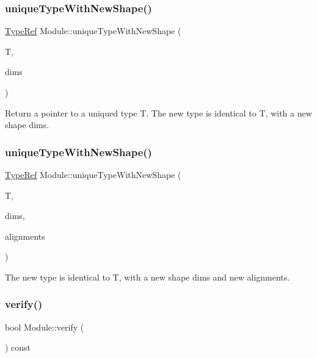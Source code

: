 \subsubsection{\texorpdfstring{unique\+Type\+With\+New\+Shape()}{uniqueTypeWithNewShape()}\hspace{0.1cm}{\footnotesize\ttfamily [1/2]}}
{\footnotesize\ttfamily \hyperlink{structglow_1_1_type}{Type\+Ref} Module\+::unique\+Type\+With\+New\+Shape (\begin{DoxyParamCaption}\item[{\hyperlink{structglow_1_1_type}{Type\+Ref}}]{T,  }\item[{llvm\+::\+Array\+Ref$<$ size\+\_\+t $>$}]{dims }\end{DoxyParamCaption})}

Return a pointer to a uniqued type {\ttfamily T}. The new type is identical to {\ttfamily T}, with a new shape {\ttfamily dims}. \mbox{\label{classglow_1_1_module_aed10d548f781d837e842690c1810e784}} 
\subsubsection{\texorpdfstring{unique\+Type\+With\+New\+Shape()}{uniqueTypeWithNewShape()}\hspace{0.1cm}{\footnotesize\ttfamily [2/2]}}
{\footnotesize\ttfamily \hyperlink{structglow_1_1_type}{Type\+Ref} Module\+::unique\+Type\+With\+New\+Shape (\begin{DoxyParamCaption}\item[{\hyperlink{structglow_1_1_type}{Type\+Ref}}]{T,  }\item[{llvm\+::\+Array\+Ref$<$ size\+\_\+t $>$}]{dims,  }\item[{llvm\+::\+Array\+Ref$<$ size\+\_\+t $>$}]{alignments }\end{DoxyParamCaption})}

The new type is identical to {\ttfamily T}, with a new shape {\ttfamily dims} and new {\ttfamily alignments}. \mbox{\label{classglow_1_1_module_a4920a99a37f71fa1b75a2f9578d2f6b1}} 
\subsubsection{\texorpdfstring{verify()}{verify()}}
{\footnotesize\ttfamily bool Module\+::verify (\begin{DoxyParamCaption}{ }\end{DoxyParamCaption}) const}

